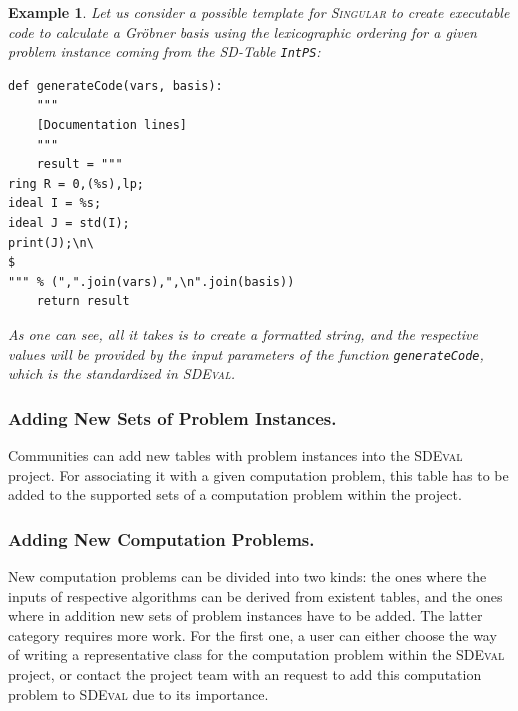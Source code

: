 \documentclass[12pt]{article}
\newtheorem{example}{Example}
\begin{document}
\begin{example}
  Let us consider a possible template for \textsc{Singular} to create
  executable code to calculate a Gr\"obner basis using the lexicographic
  ordering for a given problem instance coming from the SD-Table
  \texttt{IntPS}:
  \begin{verbatim}
def generateCode(vars, basis):
    """
    [Documentation lines]
    """
    result = """
ring R = 0,(%s),lp;
ideal I = %s;
ideal J = std(I);
print(J);\n\
$
""" % (",".join(vars),",\n".join(basis))
    return result
 \end{verbatim}%
As one can see, all it takes is to create a formatted string, and the
respective values will be provided by the input parameters of the function
\texttt{generateCode}, which is the standardized in \textsc{SDEval}.
\end{example}

\subsubsection{Adding New Sets of Problem Instances.}

Communities can add new tables with problem instances into the \textsc{SDEval}
project. For associating it with a given computation problem, this table has to
be added to the supported sets of a computation problem within the project.

\subsubsection{Adding New Computation Problems.}

New computation problems can be divided into two kinds: the ones where the
inputs of respective algorithms can be derived from existent tables, and the
ones where in addition new sets of problem instances have to be added. The
latter category requires more work. For the first one, a user can either choose
the way of writing a representative class for the computation problem within
the \textsc{SDEval} project, or contact the project team with an request to add
this computation problem to \textsc{SDEval} due to its importance.


\end{document}
